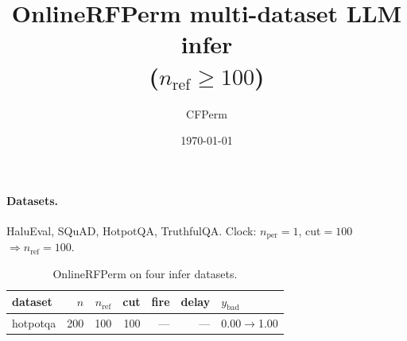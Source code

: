 \documentclass[11pt]{article}
\title{OnlineRFPerm multi-dataset LLM infer\\($n_{\mathrm{ref}}\ge 100$)}
\author{CFPerm}
\date{\today}
\begin{document}
\maketitle
\paragraph{Datasets.}
HaluEval, SQuAD, HotpotQA, TruthfulQA. Clock: $n_{\mathrm{per}}=1$, cut$=100$ $\Rightarrow n_{\mathrm{ref}}=100$.
\begin{table}[h]\centering
\caption{OnlineRFPerm on four infer datasets.}
\begin{tabular}{lrrrrrl}
\toprule dataset & $n$ & $n_{\mathrm{ref}}$ & cut & fire & delay & $y_{\mathrm{bad}}$ \\
\midrule
hotpotqa & 200 & 100 & 100 & --- & --- & 0.00$\to$1.00 \\
\bottomrule\end{tabular}\end{table}
\end{document}
